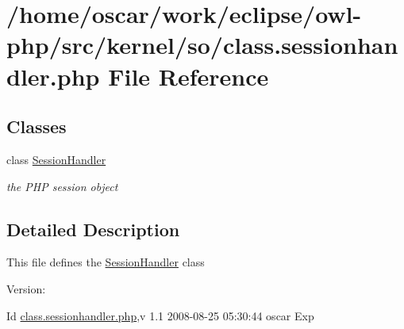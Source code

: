\hypertarget{class_8sessionhandler_8php}{
\section{/home/oscar/work/eclipse/owl-php/src/kernel/so/class.sessionhandler.php File Reference}
\label{class_8sessionhandler_8php}
}
\subsection*{Classes}
\begin{CompactItemize}
\item 
class \hyperlink{classSessionHandler}{SessionHandler}
\begin{CompactList}\small\item\em the PHP session object \item\end{CompactList}\end{CompactItemize}


\subsection{Detailed Description}
This file defines the \hyperlink{classSessionHandler}{SessionHandler} class \begin{Desc}
\item[Version:]\end{Desc}
\begin{Desc}
\item[Id]\hyperlink{class_8sessionhandler_8php}{class.sessionhandler.php},v 1.1 2008-08-25 05:30:44 oscar Exp \end{Desc}

